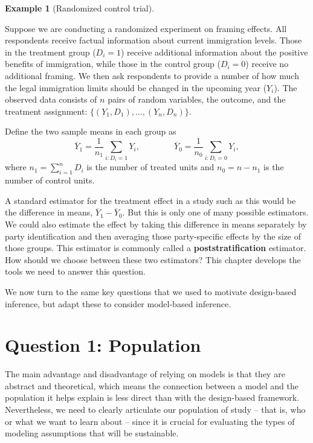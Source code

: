 \documentclass[
  13pt,
  letterpaper,
  DIV=11,
  numbers=noendperiod]{scrreprt}
\newcommand{\Ybar}{\overline{Y}}
\theoremstyle{plain}
\theoremstyle{plain}
\theoremstyle{definition}
\theoremstyle{definition}
\newtheorem{example}{Example}[chapter]
\theoremstyle{remark}
\begin{document}
\begin{example}[Randomized control
trial]\protect\hypertarget{exm-rct}{}\label{exm-rct}

Suppose we are conducting a randomized experiment on framing effects.
All respondents receive factual information about current immigration
levels. Those in the treatment group (\(D_i = 1\)) receive additional
information about the positive benefits of immigration, while those in
the control group (\(D_i = 0\)) receive no additional framing. We then
ask respondents to provide a number of how much the legal immigration
limits should be changed in the upcoming year (\(Y_i\)). The observed
data consists of \(n\) pairs of random variables, the outcome, and the
treatment assignment: \(\{(Y_1, D_1), \ldots, (Y_n, D_n)\}\).

Define the two sample means in each group as \[
\Ybar_1 = \frac{1}{n_1} \sum_{i: D_i = 1} Y_i, \qquad\qquad \Ybar_0 = \frac{1}{n_0} \sum_{i: D_i = 0} Y_i,
\] where \(n_1 = \sum_{i=1}^n D_i\) is the number of treated units and
\(n_0 = n - n_1\) is the number of control units.

A standard estimator for the treatment effect in a study such as this
would be the difference in means, \(\Ybar_1 - \Ybar_0\). But this is
only one of many possible estimators. We could also estimate the effect
by taking this difference in means separately by party identification
and then averaging those party-specific effects by the size of those
groups. This estimator is commonly called a \textbf{poststratification}
estimator. How should we choose between these two estimators? This
chapter develops the tools we need to answer this question.

\end{example}

We now turn to the same key questions that we used to motivate
design-based inference, but adapt these to consider model-based
inference.

\section{Question 1: Population}\label{question-1-population-1}

The main advantage and disadvantage of relying on models is that they
are abstract and theoretical, which means the connection between a model
and the population it helps explain is less direct than with the
design-based framework. Nevertheless, we need to clearly articulate our
population of study -- that is, who or what we want to learn about --
since it is crucial for evaluating the types of modeling assumptions
that will be sustainable.
\end{document}
